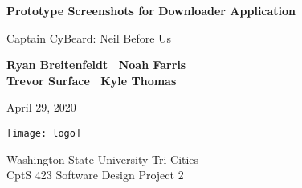 \begin{titlepage}
    \begin{center}
        \vspace*{1cm}

        \Huge
        \textbf{Prototype Screenshots for Downloader Application}

        \vspace{.5cm}
        \LARGE
        Captain CyBeard: Neil Before Us

        \vspace{1cm}

        \textbf{Ryan Breitenfeldt \textbar\ Noah Farris\\ Trevor Surface \textbar\ Kyle Thomas}

        \vspace{.2cm}
        \Large
        April 29, 2020

        \vspace{2cm}
        \texttt{[image: logo]}

        \vfill

        Washington State University Tri-Cities\\
        CptS 423 Software Design Project 2

    \end{center}
\end{titlepage}

